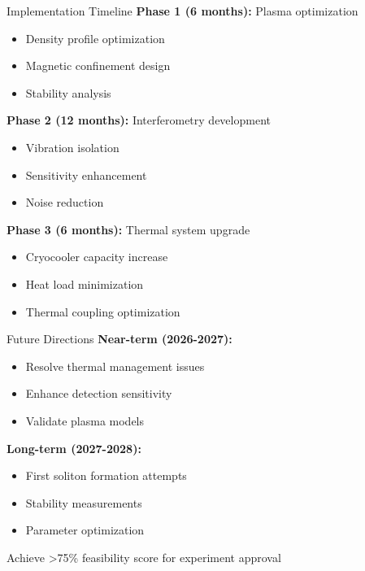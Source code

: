 \begin{frame}{Implementation Timeline}
    \textbf{Phase 1 (6 months):} Plasma optimization
    \begin{itemize}
        \item Density profile optimization
        \item Magnetic confinement design
        \item Stability analysis
    \end{itemize}
    
    \textbf{Phase 2 (12 months):} Interferometry development
    \begin{itemize}
        \item Vibration isolation
        \item Sensitivity enhancement
        \item Noise reduction
    \end{itemize}
    
    \textbf{Phase 3 (6 months):} Thermal system upgrade
    \begin{itemize}
        \item Cryocooler capacity increase
        \item Heat load minimization
        \item Thermal coupling optimization
    \end{itemize}
\end{frame}

\begin{frame}{Future Directions}
    \textbf{Near-term (2026-2027):}
    \begin{itemize}
        \item Resolve thermal management issues
        \item Enhance detection sensitivity
        \item Validate plasma models
    \end{itemize}
    
    \textbf{Long-term (2027-2028):}
    \begin{itemize}
        \item First soliton formation attempts
        \item Stability measurements
        \item Parameter optimization
    \end{itemize}
    
    \vspace{0.3cm}
     Achieve >75\% feasibility score for experiment approval
\end{frame}

